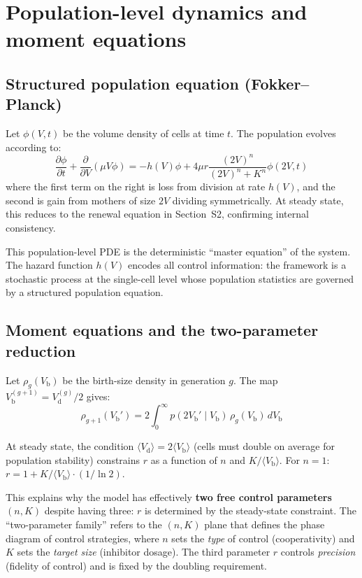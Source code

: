 \documentclass[11pt]{article}
\newcommand{\Vb}{V_{\mathrm{b}}}
\newcommand{\Vd}{V_{\mathrm{d}}}
\begin{document}
\section{Population-level dynamics and moment equations}

\subsection{Structured population equation (Fokker--Planck)}

Let $\phi(V, t)$ be the volume density of cells at time $t$.  The
population evolves according to:
\begin{equation}
  \frac{\partial \phi}{\partial t} + \frac{\partial}{\partial V}(\mu V \phi)
  = -h(V)\phi + 4\mu r \frac{(2V)^n}{(2V)^n + K^n}\phi(2V, t)
\end{equation}
where the first term on the right is loss from division at rate
$h(V)$, and the second is gain from mothers of size $2V$ dividing
symmetrically.  At steady state, this reduces to the renewal equation
in Section~S2, confirming internal consistency.

This population-level PDE is the deterministic ``master equation''
of the system.  The hazard function $h(V)$ encodes all control
information: the framework is a stochastic process at the single-cell
level whose population statistics are governed by a structured
population equation.

\subsection{Moment equations and the two-parameter reduction}

Let $\rho_g(\Vb)$ be the birth-size density in generation $g$.  The
map $\Vb^{(g+1)} = \Vd^{(g)}/2$ gives:
\begin{equation}
  \rho_{g+1}(\Vb') = 2 \int_0^\infty p(2\Vb' \mid \Vb)\,
    \rho_g(\Vb)\, d\Vb
\end{equation}

At steady state, the condition $\langle \Vd \rangle = 2\langle \Vb \rangle$
(cells must double on average for population stability) constrains $r$
as a function of $n$ and $K/\langle\Vb\rangle$.  For $n = 1$:
$r = 1 + K/\langle\Vb\rangle \cdot (1/\ln 2)$.

This explains why the model has effectively \textbf{two free control
parameters} $(n, K)$ despite having three: $r$ is determined by the
steady-state constraint.  The ``two-parameter family'' refers to the
$(n, K)$ plane that defines the phase diagram of control strategies,
where $n$ sets the \emph{type} of control (cooperativity) and $K$
sets the \emph{target size} (inhibitor dosage).  The third parameter
$r$ controls \emph{precision} (fidelity of control) and is fixed by
the doubling requirement.
\end{document}
